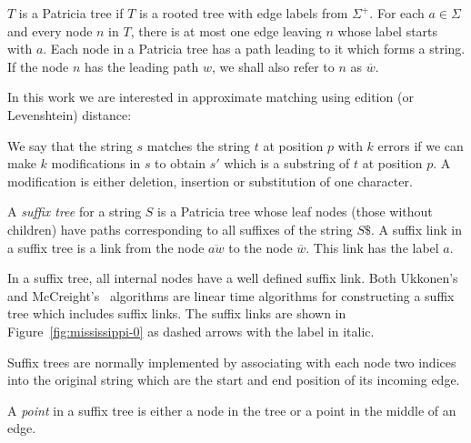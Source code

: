 \begin{definition}
$T$ is a Patricia tree if $T$ is a rooted tree with edge labels from $\Sigma^+$. For each $a \in \Sigma$ and every node $n$ in $T$, there is at most one edge leaving $n$ whose label starts with $a$. Each node in a Patricia tree has a path leading to it which forms a string. If the node $n$ has the leading path $w$, we shall also refer to $n$ as $\overline{w}$.
\end{definition}

%
In this work we are interested in approximate matching using edition (or Levenshtein) distance:

\begin{definition}
We say that the string $s$ matches the string $t$ at position $p$ with $k$ errors if we can make $k$ modifications in $s$ to obtain $s'$ which is a substring of $t$ at position $p$. A modification is either deletion, insertion or substitution of one character.
\end{definition}

\begin{definition}
A \emph{suffix tree} for a string $S$ is a Patricia tree whose leaf nodes (those without children) have paths corresponding to all suffixes of the string $S\$ $. A suffix link in a suffix tree is a link from the node $\overline{aw}$ to the node $\overline{w}$. This link has the label $a$.
\end{definition}

In a suffix tree, all internal nodes have a well defined suffix link. Both Ukkonen's~\cite{ukkonen92constructing} and McCreight's~\cite{mccreight} algorithms are linear time algorithms for constructing a suffix tree which includes suffix links. The suffix links are shown in Figure~\ref{fig:mississippi-0} as dashed arrows with the label in italic.

Suffix trees are normally implemented by associating with each node two indices into the original string which are the start and end position of its incoming edge.

\begin{definition}
A \emph{point} in a suffix tree is either a node in the tree or a point in the middle of an edge.
\end{definition}

